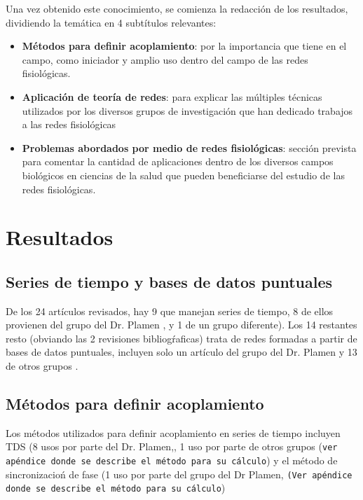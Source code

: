 \documentclass[twoside,twocolumn]{article}
\begin{document}
Una vez obtenido este conocimiento, se comienza la redacción de los resultados, dividiendo la temática en 4 subtítulos relevantes:
\begin{itemize}
  \item \textbf{Métodos para definir acoplamiento}: por la importancia que tiene en el campo, como iniciador y amplio uso dentro del campo de las redes fisiológicas.
  \item \textbf{Aplicación de teoría de redes}: para explicar las múltiples técnicas utilizados por los diversos grupos de investigación que han dedicado trabajos a las redes fisiológicas
  \item \textbf{Problemas abordados por medio de redes fisiológicas}: sección prevista para comentar la cantidad de aplicaciones dentro de los diversos campos biológicos en ciencias de la salud que pueden beneficiarse del estudio de las redes fisiológicas.
\end{itemize}

\section{Resultados}

\subsection{Series de tiempo y bases de datos puntuales}
De los 24 artículos revisados, hay 9 que manejan series de tiempo, 8 de ellos provienen del grupo del Dr. Plamen \cite{bashan2012network}\cite{bartsch2014coexisting}\cite{liu2015major}\cite{bartsch2015network}\cite{2015Plasticity}\cite{lin2016delay}\cite{rizzo2020network}\cite{lin2020dynamic},\cite{ivanov2021signal}
y 1 de un grupo diferente\cite{jansen2019network}).
Los 14 restantes resto (obviando las 2 revisiones bibliogŕaficas) trata de redes formadas a partir de bases de datos puntuales, incluyen solo un artículo del grupo del Dr. Plamen\cite{nakazato2020estimation} y 13 de otros grupos \cite{scala2014complex}\cite{chmiel2014spreading}\cite{monti2018network}\cite{pereira2018computational}\cite{pereira2019complex}\cite{zanetti2019information}\cite{barajas2020metabolic}\cite{lehnertz2020human}\cite{antonacci2020information}\cite{tan2020organ}\cite{barajas2021physiological}\cite{barajas2021sex}\cite{cohen2021robust}.

\subsection{Métodos para definir acoplamiento}
Los métodos utilizados para definir acoplamiento en series de tiempo incluyen TDS (8 usos por parte del Dr. Plamen\cite{bashan2012network}\cite{bartsch2014coexisting}\cite{liu2015major}\cite{bartsch2015network}\cite{2015Plasticity}\cite{lin2016delay}\cite{rizzo2020network}\cite{lin2020dynamic},\cite{ivanov2021signal}, 1 uso por parte de otros grupos \cite{jansen2019network}(\texttt{ver apéndice donde se describe el método para su cálculo}) y
el método de sincronizacioń de fase (1 uso por parte del grupo del Dr Plamen\cite{bartsch2014coexisting}, \texttt{(Ver apéndice donde se describe el método para su cálculo})
\end{document}
